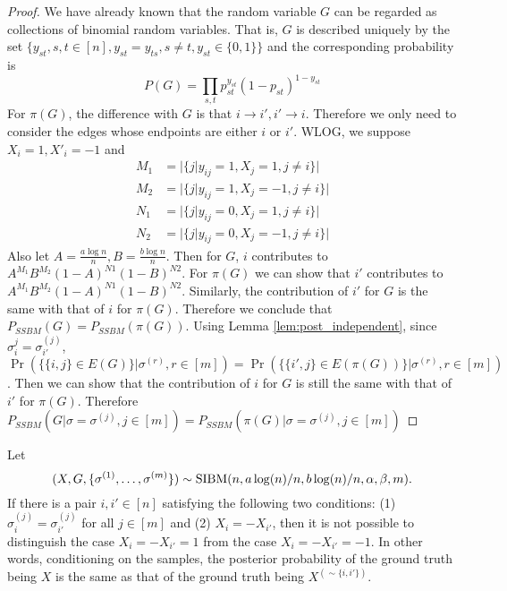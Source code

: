 \documentclass{article}
\begin{document}
\begin{proof}
	We have already known that the random variable $G$ can be regarded as collections of binomial random variables.
	That is, $G$ is described uniquely by the set $\{y_{st}, s,t \in [n], y_{st}=y_{ts}, s\neq t, y_{st} \in \{0, 1\} \}$ and the corresponding probability is
	\begin{equation}
	P(G) = \prod_{s,t} p_{st}^{y_{st}} (1 - p_{st})^{1-y_{st}}
	\end{equation}
	For $\pi(G)$, the difference with $G$ is that $i \to i', i' \to i$.
	Therefore we only need to consider the edges whose endpoints are either $i$ or $i'$. WLOG, we suppose $X_i=1, X'_i=-1$
	and 
	\begin{align*}
	M_1 &= |\{j | y_{ij} = 1, X_j = 1, j \neq i \}| \\
	M_2 &= |\{j | y_{ij} = 1, X_j = -1, j \neq i\}| \\
	N_1 &= |\{j | y_{ij} = 0, X_j = 1, j \neq i\}| \\
	N_2 &= |\{j | y_{ij} = 0, X_j = -1, j \neq i\}|	
	\end{align*}
	Also let $A=\frac{a \log n }{n}, B=\frac{b \log n}{n}$.
	Then for $G$, $i$ contributes to $A^{M_1} B^{M_2}(1-A)^{N1}(1-B)^{N2}$. For $\pi(G)$ we can show that $i'$ contributes
	to $A^{M_1} B^{M_2}(1-A)^{N1}(1-B)^{N2}$. Similarly, the contribution of $i'$ for $G$ is the same with that of $i$ for $\pi(G)$. Therefore
	we conclude that $P_{SSBM}(G) = P_{SSBM}(\pi(G))$. Using Lemma \ref{lem:post_independent}, since $\sigma_i^{j} = \sigma_{i'}^{(j)}$,
	$\Pr(\{\{i,j\} \in E(G)\} | \sigma^{(r)}, r\in[m]) =\Pr(\{\{i',j\} \in E(\pi(G))\} | \sigma^{(r)}, r\in[m])$.
	Then we can show that the contribution of $i$ for $G$ is still the same with that of $i'$ for $\pi(G)$. Therefore
	$P_{SSBM}(G | \sigma=\sigma^{(j)},j\in[m]) = P_{SSBM}(\pi(G) | \sigma=\sigma^{(j)},j\in[m])$
\end{proof}
\begin{lemma} \label{lm:qq}
	Let 
	$$
	(X,G,\{\sigma^{(1)},\dots,\sigma^{(m)}\})\sim \operatorname{SIBM}(n,a\log(n)/n, b\log(n)/n,\alpha,\beta, m) .
	$$
	If there is a pair $i,i'\in[n]$ satisfying the following two conditions: (1) $\sigma_i^{(j)}=\sigma_{i'}^{(j)}$ for all $j\in[m]$ and (2) $X_i=-X_{i'}$, then it is not possible to distinguish the case $X_i=-X_{i'}=1$ from the case $X_i=-X_{i'}=-1$. In other words, conditioning on the samples, the posterior probability of the ground truth being $X$ is the same as that of the ground truth being $X^{(\sim\{i,i'\})}$.
\end{lemma}
\end{document}
